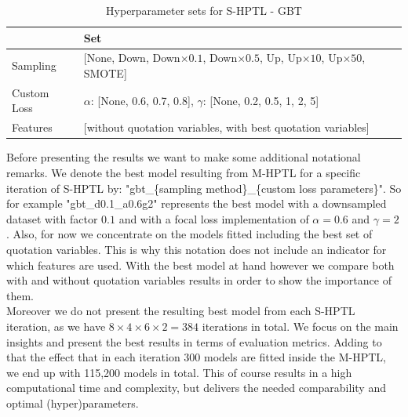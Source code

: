 \documentclass[12pt,titlepage]{article}
\begin{document}
\begin{table}
    \centering
    \caption{Hyperparameter sets for S-HPTL - GBT}
    \begin{tabular}{|l|l|}
    \hline
              & Set  \\
    \hline
    Sampling &  [None, Down, Down$\times0.1$, Down$\times0.5$, Up, Up$\times10$, Up$\times50$, SMOTE]  \\
    Custom Loss & $\alpha$: [None, 0.6, 0.7, 0.8], $\gamma$: [None, 0.2, 0.5, 1, 2, 5] \\
    Features & [without quotation variables, with best quotation variables] \\
    \hline
    \end{tabular}
\end{table}

Before presenting the results we want to make some additional notational remarks. We denote the best model resulting from M-HPTL for a specific iteration of S-HPTL by: "gbt\_\{sampling method\}\_\{custom loss parameters\}". So for example "gbt\_d0.1\_a0.6g2" represents the best model with a downsampled dataset with factor $0.1$ and with a focal loss implementation of $\alpha=0.6$ and $\gamma=2$. Also, for now we concentrate on the models fitted including the best set of quotation variables. This is why this notation does not include an indicator for which features are used. With the best model at hand however we compare both with and without quotation variables results in order to show the importance of them. \\
Moreover we do not present the resulting best model from each S-HPTL iteration, as we have $8\times4\times6\times2=384$ iterations in total. We focus on the main insights and present the best results in terms of evaluation metrics. Adding to that the effect that in each iteration 300 models are fitted inside the M-HPTL, we end up with 115,200 models in total. This of course results in a high computational time and complexity, but delivers the needed comparability and optimal (hyper)parameters. \\
\end{document}
